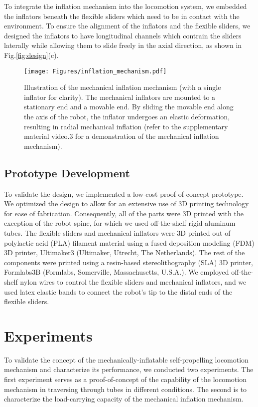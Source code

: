 \documentclass[letterpaper, 10 pt, conference]{ieeeconf}  %
\begin{document}
To integrate the inflation mechanism into the locomotion system, we embedded the inflators beneath the flexible sliders which need to be in contact with the environment. To ensure the alignment of the inflators and the flexible sliders, we designed the inflators to have longitudinal channels which contrain the sliders laterally while allowing them to slide freely in the axial direction, as shown in Fig.\ref{fig:design}(c).

\begin{figure}[t!]
    \centering
\texttt{[image: Figures/inflation\_mechanism.pdf]}
\caption{Illustration of the mechanical inflation mechanism (with a single inflator for clarity). The mechanical inflators are mounted to a stationary end and a movable end. By sliding the movable end along the axis of the robot, the inflator undergoes an elastic deformation, resulting in radial mechanical inflation (refer to the supplementary material video.3 for a demonstration of the mechanical inflation mechanism).}
\label{fig:inflation_mechanism}
\end{figure}

\subsection*{Prototype Development}
To validate the design, we implemented a low-cost proof-of-concept prototype. We optimized the design to allow for an extensive use of 3D printing technology for ease of fabrication. Consequently, all of the parts were 3D printed with the exception of the robot spine, for which we used off-the-shelf rigid aluminum tubes. The flexible sliders and mechanical inflators were 3D printed out of polylactic acid (PLA) filament material using a fused deposition modeling (FDM) 3D printer, Ultimaker3 (Ultimaker, Utrecht, The Netherlands). The rest of the components were printed using a resin-based stereolithography (SLA) 3D printer, Formlabs3B (Formlabs, Somerville, Massachusetts, U.S.A.). We employed off-the-shelf nylon wires to control the flexible sliders and mechanical inflators, and we used latex elastic bands to connect the robot's tip to the distal ends of the flexible sliders.



\section{Experiments}
To validate the concept of the mechanically-inflatable self-propelling locomotion mechanism and characterize its performance, we conducted two experiments. The first experiment serves as a proof-of-concept of the capability of the locomotion mechanism in traversing through tubes in different conditions. The second is to characterize the load-carrying capacity of the mechanical inflation mechanism. 
\end{document}
